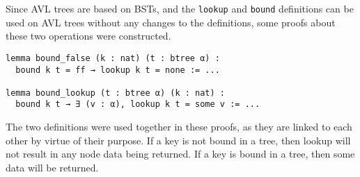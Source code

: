 Since AVL trees are based on BSTs, and the \lstinline{lookup} and \lstinline{bound} definitions can be used on AVL trees without any changes to the definitions, some proofs about these two operations were constructed.

\begin{lstlisting}
lemma bound_false (k : nat) (t : btree α) :
  bound k t = ff → lookup k t = none := ...

lemma bound_lookup (t : btree α) (k : nat) :
  bound k t → ∃ (v : α), lookup k t = some v := ...
\end{lstlisting}

The two definitions were used together in these proofs, as they are linked to each other by virtue of their purpose. If a key is not bound in a tree, then lookup will not result in any node data being returned. If a key is bound in a tree, then some data will be returned.